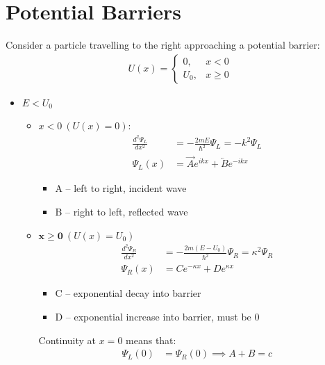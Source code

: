 \documentclass[a4paper, 11pt, normalem]{report}
\begin{document}
\section{Potential Barriers}
Consider a particle travelling to the right approaching a potential barrier:
\begin{align}
    U(x) =
    \begin{cases}
        0,     & x < 0 \\
        U_{0}, & x \geq 0
    \end{cases}
\end{align}
\begin{itemize}
    \item $E < U_{0}$
        \begin{itemize}
            \item $x < 0~(U(x) = 0)$:
                \begin{align}
                    \frac{d^{2}\Psi_{L}}{dx^{2}} &= -\frac{2mE}{\hbar^{2}}\Psi_{L} = -k^{2}\Psi_{L} \\
                    \Psi_{L}(x) &= \overrightarrow{A}e^{ikx} + \overleftarrow{B}e^{-ikx}
                \end{align}
                \begin{itemize}
                    \item A -- left to right, incident wave
                    \item B -- right to left, reflected wave
                \end{itemize}
            \item $\mathbf{x \geq 0}~(U(x) = U_{0})$
                \begin{align}
                    \frac{d^{2}\Psi_{R}}{dx^{2}} &= -\frac{2m(E - U_{0})}{\hbar^{2}}\Psi_{R} = \kappa^{2}\Psi_{R} \\
                    \Psi_{R}(x) &= Ce^{-\kappa x} + De^{\kappa x}
                \end{align}
                \begin{itemize}
                    \item C -- exponential decay into barrier
                    \item D -- exponential increase into barrier, must be 0
                \end{itemize}
                \vspace{10pt}
                Continuity at $x = 0$ means that:
                \begin{align}
                    \Psi_{L}(0) &= \Psi_{R}(0) \implies A + B = c

\end{align}
\end{itemize}
\end{itemize}
\end{document}
